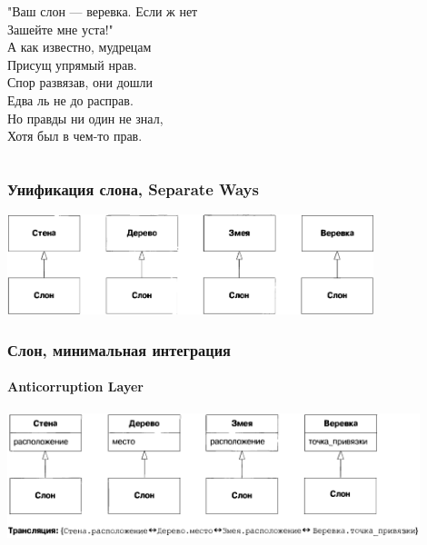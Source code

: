 \documentclass[xetex,mathserif,serif]{beamer}
\begin{document}
\begin{frame}
\begin{ssmall}
\begin{columns}
\begin{column}{0.33\textwidth}
					"Ваш слон --- веревка. Если ж нет \\
					Зашейте мне уста!" \\
					\vspace{5mm}
					А как известно, мудрецам \\
					Присущ упрямый нрав. \\
					Спор развязав, они дошли \\
					Едва ль не до расправ. \\
					Но правды ни один не знал, \\
					Хотя был в чем-то прав.
				\end{column}
			\end{columns}
		\end{ssmall}
	\end{frame}

	\begin{frame}
		\frametitle{Унификация слона, Separate Ways}
		\begin{center}
			\includegraphics[width=0.8\textwidth]{elephantSeparateWays.png}
		\end{center}
	\end{frame}

	\begin{frame}
		\frametitle{Слон, минимальная интеграция}
		\framesubtitle{Anticorruption Layer}
		\begin{center}
			\includegraphics[width=0.9\textwidth]{elephantAnticorruptionLayer.png}
		\end{center}
	\end{frame}
\end{document}
